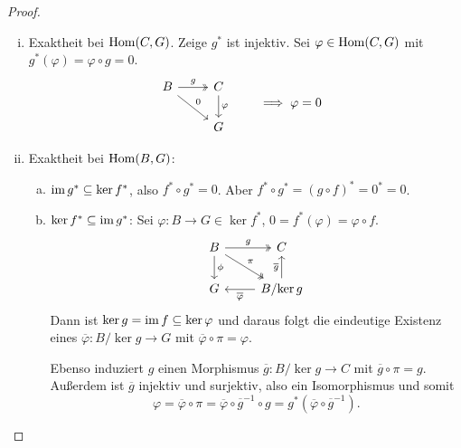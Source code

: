 \begin{proof}
  \begin{enumerate}[(i)]
    \item 
      Exaktheit bei $\mathrm{Hom}(C,G)$.
      Zeige $g^*$ ist injektiv.
      Sei $\varphi \in \mathrm{Hom}(C,G)$ mit $g^*(\varphi) = \varphi \circ g  = 0$.
      \begin{align*}
        \begin{tikzcd}[ampersand replacement=\&]
          B \arrow{rd}{0} \arrow[twoheadrightarrow]{r}{g}  \& C \arrow{d}{\varphi} \\
                                        \& G
        \end{tikzcd}
        & \qquad \implies \varphi = 0
      \end{align*}
    \item
      Exaktheit bei $\mathrm{Hom}(B,G)$:
      \begin{enumerate}[(a)]
        \item 
          $\operatorname{im} g^* \subseteq \ker f^*$, also $f^* \circ g^* = 0$.
          Aber $f^* \circ g^* = {(g \circ f)}^* = 0^* = 0$.
        \item
          $\ker f^* \subseteq \operatorname{im} g^*$:
          Sei $\varphi \colon B \to G \in \ker f^*$, $0 = f^*(\varphi) = \varphi \circ f$.
          \begin{equation*}
            \begin{tikzcd}
              B \arrow[twoheadrightarrow]{r}{g}
                \arrow[twoheadrightarrow]{rd}{\pi}
                \arrow{d}{\phi}
                & C \\
              G & B/{\ker g}  \arrow{u}{\overline g}
                              \arrow{l}{\overline \varphi}
            \end{tikzcd}
          \end{equation*}
          Dann ist $\ker g = \operatorname{im} f \subseteq \ker \varphi$ und daraus folgt die eindeutige Existenz eines $\overline \varphi \colon B/{\ker g} \to G$ mit $\overline \varphi \circ \pi = \varphi$.

          Ebenso induziert $g$ einen Morphismus $\overline g\colon B/{\ker g} \to C$ mit $\overline g \circ \pi = g$.
          Außerdem ist $\overline g$ injektiv und surjektiv, also ein Isomorphismus und somit
          \begin{equation*}
            \varphi = \overline \varphi \circ \pi = \overline \varphi \circ {\overline g}^{-1} \circ g = g^* (\overline \varphi \circ {\overline g}^{-1}).
            \end{equation*}
      \end{enumerate}
  \end{enumerate}
\end{proof}
